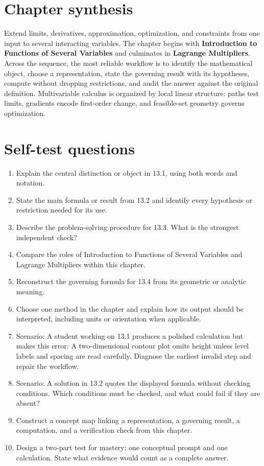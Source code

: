\documentclass[11pt]{article}
\begin{document}
\section{Chapter synthesis}
Extend limits, derivatives, approximation, optimization, and constraints from one input to several interacting variables. The chapter begins with \textbf{Introduction to Functions of Several Variables} and culminates in \textbf{Lagrange Multipliers}. Across the sequence, the most reliable workflow is to identify the mathematical object, choose a representation, state the governing result with its hypotheses, compute without dropping restrictions, and audit the answer against the original definition. Multivariable calculus is organized by local linear structure: paths test limits, gradients encode first-order change, and feasible-set geometry governs optimization.

\section{Self-test questions}
\begin{enumerate}
\item Explain the central distinction or object in 13.1, using both words and notation.
\item State the main formula or result from 13.2 and identify every hypothesis or restriction needed for its use.
\item Describe the problem-solving procedure for 13.3. What is the strongest independent check?
\item Compare the roles of Introduction to Functions of Several Variables and Lagrange Multipliers within this chapter.
\item Reconstruct the governing formula for 13.4 from its geometric or analytic meaning.
\item Choose one method in the chapter and explain how its output should be interpreted, including units or orientation when applicable.
\item Scenario: A student working on 13.1 produces a polished calculation but makes this error: A two-dimensional contour plot omits height unless level labels and spacing are read carefully. Diagnose the earliest invalid step and repair the workflow.
\item Scenario: A solution in 13.2 quotes the displayed formula without checking conditions. Which conditions must be checked, and what could fail if they are absent?
\item Construct a concept map linking a representation, a governing result, a computation, and a verification check from this chapter.
\item Design a two-part test for mastery: one conceptual prompt and one calculation. State what evidence would count as a complete answer.
\end{enumerate}
\end{document}
